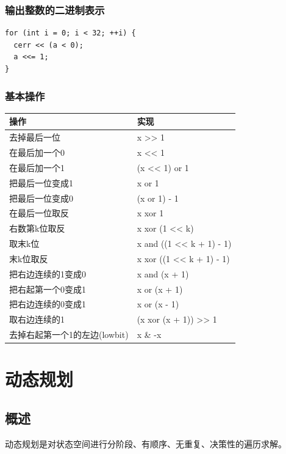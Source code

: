 \documentclass[11pt]{article}
\begin{document}
\subsubsection{输出整数的二进制表示}
\label{sec:orgeb3aeec}

\begin{verbatim}
for (int i = 0; i < 32; ++i) {
  cerr << (a < 0);
  a <<= 1;
}
\end{verbatim}

\subsubsection{基本操作}
\label{sec:org0e840e0}

\begin{center}
\begin{tabular}{ll}
操作 & 实现\\
\hline
去掉最后一位 & x >> 1\\
在最后加一个0 & x << 1\\
在最后加一个1 & (x << 1) or 1\\
把最后一位变成1 & x or 1\\
把最后一位变成0 & (x or 1) - 1\\
在最后一位取反 & x xor 1\\
右数第k位取反 & x xor (1 << k)\\
取末k位 & x and ((1 << k + 1) - 1)\\
末k位取反 & x xor ((1 << k + 1) - 1)\\
把右边连续的1变成0 & x and (x + 1)\\
把右起第一个0变成1 & x or (x + 1)\\
把右边连续的0变成1 & x or (x - 1)\\
取右边连续的1 & (x xor (x + 1)) >> 1\\
去掉右起第一个1的左边(lowbit) & x \& -x\\
\end{tabular}
\end{center}

\section{动态规划}
\label{sec:org3e84c36}
\subsection{概述}
\label{sec:org696b53b}

动态规划是对状态空间进行分阶段、有顺序、无重复、决策性的遍历求解。
\end{document}
